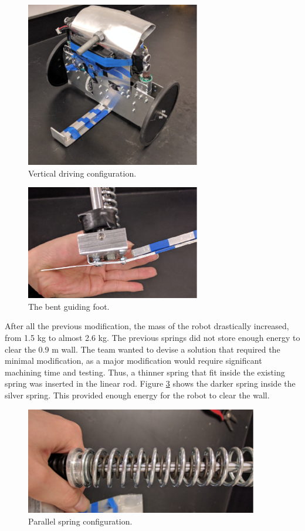 \documentclass[ece]{uw-wkrpt}
\begin{document}
\begin{figure}
    \centering
    \includegraphics[width=3.0in]{res/mech9}
    \caption[Vertical driving configuration]
          {Vertical driving configuration.}
    \label{fig:mech9}
\end{figure}

\begin{figure}
    \centering
    \includegraphics[width=3.0in]{res/mech10}
    \caption[The bent guiding foot]
          {The bent guiding foot.}
    \label{fig:mech10}
\end{figure}

After all the previous modification, the mass of the robot drastically increased, from 1.5 kg to almost 2.6 kg. The previous springs did not store enough energy to clear the 0.9 m wall. The team wanted to devise a solution that required the minimal modification, as a major modification would require significant machining time and testing. Thus, a thinner spring that fit inside the existing spring was inserted in the linear rod. Figure \ref{fig:mech11} shows the darker spring inside the silver spring. This provided enough energy for the robot to clear the wall.

\break

\begin{figure}
    \centering
    \includegraphics[width=4in]{res/mech11}
    \caption[Parallel spring configuration]
          {Parallel spring configuration.}
    \label{fig:mech11}
\end{figure}
\end{document}
